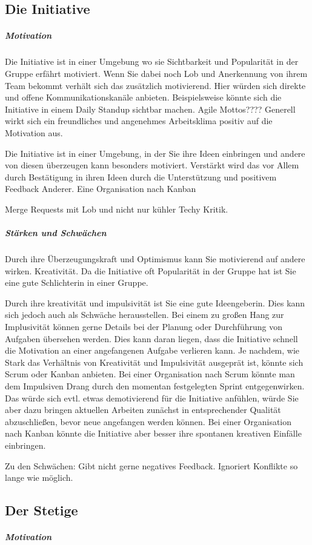 \documentclass[twocolumn,10pt]{asme2ej}
\begin{document}
\subsection{Die Initiative}
\subparagraph{Motivation}

Die Initiative ist in einer Umgebung wo sie Sichtbarkeit und Popularität in der Gruppe erfährt motiviert. Wenn Sie dabei noch Lob und Anerkennung von ihrem Team bekommt verhält sich das zusätzlich motivierend. Hier würden sich direkte und offene Kommunikationskanäle anbieten. Beispielsweise könnte sich die Initiative in einem Daily Standup sichtbar machen. Agile Mottos???? Generell wirkt sich ein freundliches und angenehmes Arbeitsklima positiv auf die Motivation aus. 

Die Initiative ist in einer Umgebung, in der Sie ihre Ideen einbringen und andere von diesen überzeugen kann besonders motiviert. Verstärkt wird das vor Allem durch Bestätigung in ihren Ideen durch die Unterstützung und positivem Feedback Anderer. Eine Organisation nach Kanban 

 Merge Requests mit Lob und nicht nur kühler Techy Kritik. 

\subparagraph{Stärken und Schwächen}
Durch ihre Überzeugungskraft und Optimismus kann Sie motivierend auf andere wirken. 
Kreativität. 
Da die Initiative oft Popularität in der Gruppe hat ist Sie eine gute Schlichterin in einer Gruppe.

Durch ihre kreativität und impulsivität ist Sie eine gute Ideengeberin. Dies kann sich jedoch auch als Schwäche herausstellen. Bei einem zu großen Hang zur Implusivität können gerne Details bei der Planung oder Durchführung von Aufgaben übersehen werden. Dies kann daran liegen, dass die Initiative schnell die Motivation an einer angefangenen Aufgabe verlieren kann. Je nachdem, wie Stark das Verhältnis von Kreativität und Impulsivität ausgeprät ist, könnte sich Scrum oder Kanban anbieten. Bei einer Organisation nach Scrum könnte man dem Impulsiven Drang durch den momentan festgelegten Sprint entgegenwirken. Das würde sich evtl. etwas demotivierend für die Initiative anfühlen, würde Sie aber dazu bringen aktuellen Arbeiten zunächst in entsprechender Qualität abzuschließen, bevor neue angefangen werden können. Bei einer Organisation nach Kanban könnte die Initiative aber besser ihre spontanen kreativen Einfälle einbringen.

Zu den Schwächen: 
Gibt nicht gerne negatives Feedback. Ignoriert Konflikte so lange wie möglich. 


\subsection{Der Stetige}
\subparagraph{Motivation}
\end{document}
